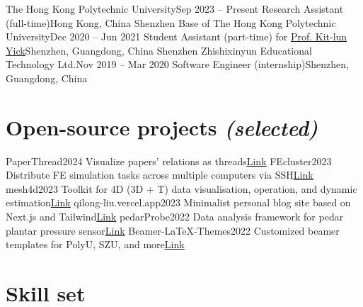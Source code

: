 \documentclass[letterpaper,11pt]{article}
\begin{document}
    \resumeSubHeadingListStart
        \resumeSubheading
            {The Hong Kong Polytechnic University}{Sep 2023 -- Present}
            {Research Assistant (full-time)}{Hong Kong, China}
        \resumeSubheading
            {Shenzhen Base of The Hong Kong Polytechnic University}{Dec 2020 -- Jun 2021}
            {Student Assistant (part-time) for \href{https://research.polyu.edu.hk/en/persons/kit-lun-yick}{Prof. Kit-lun Yick}}{Shenzhen, Guangdong, China}
        \resumeSubheading
            {Shenzhen Zhishixinyun Educational Technology Ltd.}{Nov 2019 -- Mar 2020}
            {Software Engineer (internship)}{Shenzhen, Guangdong, China}
    \resumeSubHeadingListEnd

    \section{Open-source projects \emph{(selected)}}

    \resumeSubHeadingListStart
        \resumeSubheading
            {PaperThread}{2024}
            {Visualize papers' relations as threads}{\href{https://github.com/liu-qilong/obsidian-setup}{\underline{Link}}}
        \resumeSubheading
            {FEcluster}{2023}
            {Distribute FE simulation tasks across multiple computers via SSH}{\href{https://github.com/liu-qilong/FEcluster}{\underline{Link}}}
        \resumeSubheading
            {mesh4d}{2023}
            {Toolkit for 4D (3D + T) data visualisation, operation, and dynamic estimation}{\href{https://github.com/liu-qilong/mesh4d}{\underline{Link}}}
        \resumeSubheading
            {qilong-liu.vercel.app}{2023}
            {Minimalist personal blog site based on Next.js and Tailwind}{\href{https://github.com/liu-qilong/qilong-liu}{\underline{Link}}}
        \resumeSubheading
            {pedarProbe}{2022}
            {Data analysis framework for pedar plantar pressure sensor}{\href{https://github.com/liu-qilong/pedarProbe}{\underline{Link}}}
        \resumeSubheading
            {Beamer-LaTeX-Themes}{2022}
            {Customized beamer templates for PolyU, SZU, and more}{\href{https://github.com/liu-qilong/Beamer-LaTeX-Themes}{\underline{Link}}}
    \resumeSubHeadingListEnd

    \section{Skill set}
\end{document}
